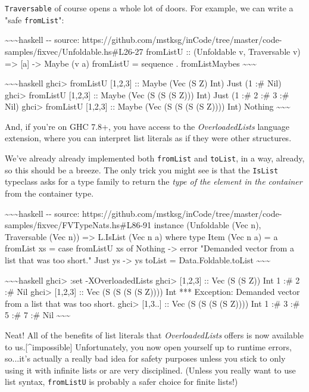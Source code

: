 \documentclass[]{article}
\begin{document}
\texttt{Traversable} of course opens a whole lot of doors. For example, we can
write a "safe \texttt{fromList}":

\textasciitilde{}\textasciitilde{}\textasciitilde{}haskell -\/- source:
https://github.com/mstksg/inCode/tree/master/code-samples/fixvec/Unfoldable.hs\#L26-27
fromListU :: (Unfoldable v, Traversable v) =\textgreater{} {[}a{]}
-\textgreater{} Maybe (v a) fromListU = sequence . fromListMaybes
\textasciitilde{}\textasciitilde{}\textasciitilde{}

\textasciitilde{}\textasciitilde{}\textasciitilde{}haskell ghci\textgreater{}
fromListU {[}1,2,3{]} :: Maybe (Vec (S Z) Int) Just (1 :\# Nil)
ghci\textgreater{} fromListU {[}1,2,3{]} :: Maybe (Vec (S (S (S Z))) Int) Just
(1 :\# 2 :\# 3 :\# Nil) ghci\textgreater{} fromListU {[}1,2,3{]} :: Maybe (Vec
(S (S (S (S Z)))) Int) Nothing
\textasciitilde{}\textasciitilde{}\textasciitilde{}

And, if you're on GHC 7.8+, you have access to the \emph{OverloadedLists}
language extension, where you can interpret list literals as if they were other
structures.

We've already already implemented both \texttt{fromList} and \texttt{toList}, in
a way, already, so this should be a breeze. The only trick you might see is that
the \texttt{IsList} typeclass asks for a type family to return the \emph{type of
the element in the container} from the container type.

\textasciitilde{}\textasciitilde{}\textasciitilde{}haskell -\/- source:
https://github.com/mstksg/inCode/tree/master/code-samples/fixvec/FVTypeNats.hs\#L86-91
instance (Unfoldable (Vec n), Traversable (Vec n)) =\textgreater{} L.IsList (Vec
n a) where type Item (Vec n a) = a fromList xs = case fromListU xs of Nothing
-\textgreater{} error "Demanded vector from a list that was too short." Just ys
-\textgreater{} ys toList = Data.Foldable.toList
\textasciitilde{}\textasciitilde{}\textasciitilde{}

\textasciitilde{}\textasciitilde{}\textasciitilde{}haskell ghci\textgreater{}
:set -XOverloadedLists ghci\textgreater{} {[}1,2,3{]} :: Vec (S (S Z)) Int 1 :\#
2 :\# Nil ghci\textgreater{} {[}1,2,3{]} :: Vec (S (S (S (S Z)))) Int ***
Exception: Demanded vector from a list that was too short. ghci\textgreater{}
{[}1,3..{]} :: Vec (S (S (S (S Z)))) Int 1 :\# 3 :\# 5 :\# 7 :\# Nil
\textasciitilde{}\textasciitilde{}\textasciitilde{}

Neat! All of the benefits of list literals that \emph{OverloadedLists} offers is
now available to us.{[}\^{}impossible{]} Unfortunately, you now open yourself up
to runtime errors, so...it's actually a really bad idea for safety purposes
unless you stick to only using it with infinite lists or are very disciplined.
(Unless you really want to use list syntax, \texttt{fromListU} is probably a
safer choice for finite lists!)
\end{document}

